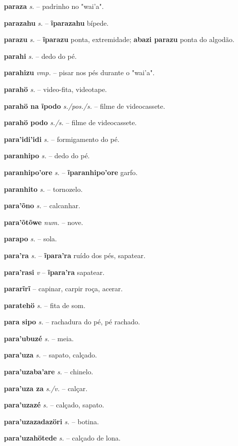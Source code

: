 \textbf{paraza} \textit{s.} -- padrinho no "wai'a".

\textbf{parazahu} \textit{s.} -- \textbf{ĩparazahu} bípede.

\textbf{parazu} \textit{s.} -- \textbf{ĩparazu} ponta, extremidade; \textbf{abazi parazu} ponta do algodão.

\textbf{parahi} \textit{s.} -- dedo do pé.

\textbf{parahizu} \textit{vmp.} -- pisar nos pés durante o "wai'a".

\textbf{parahö} \textit{s.} -- video-fita, videotape.

\textbf{parahö na ĩpodo} \textit{s./pos./s.} -- filme de videocassete.

\textbf{parahö podo} \textit{s./s.} -- filme de videocassete.

\textbf{para'idi'idi} \textit{s.} -- formigamento do pé.

\textbf{paranhipo} \textit{s.} -- dedo do pé.

\textbf{paranhipo'ore} \textit{s.} -- \textbf{ĩparanhipo'ore} garfo.

\textbf{paranhito} \textit{s.} -- tornozelo.

\textbf{para'õno} \textit{s.} -- calcanhar.

\textbf{para'õtõwe} \textit{num.} -- nove.

\textbf{parapo} \textit{s.} -- sola.

\textbf{para'ra} \textit{s.} -- \textbf{ĩpara'ra} ruído dos pés, sapatear.

\textbf{para'rasi} \textit{v} -- \textbf{ĩpara'ra} sapatear.

\textbf{pararĩrĩ} -- capinar, carpir roça, acerar.

\textbf{paratehö} \textit{s.} -- fita de som.

\textbf{para sipo} \textit{s.} -- rachadura do pé, pé rachado.

\textbf{para'ubuzé} \textit{s.} -- meia.

\textbf{para'uza} \textit{s.} -- sapato, calçado.

\textbf{para'uzaba'are} \textit{s.} -- chinelo.

\textbf{para'uza za} \textit{s./v.} -- calçar.

\textbf{para'uzazé} \textit{s.} -- calçado, sapato.

\textbf{para'uzazadazöri} \textit{s.} -- botina.

\textbf{para'uzahötede} \textit{s.} -- calçado de lona.

